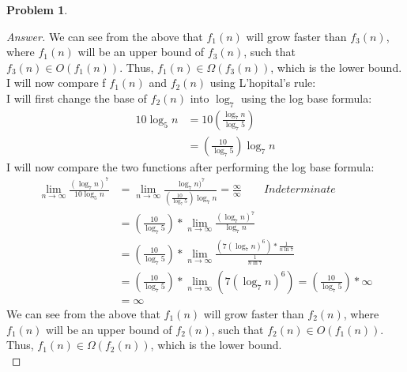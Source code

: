 \documentclass[11pt]{article}
\theoremstyle{definition}
\theoremstyle{definition}
\newtheorem{required}{Problem}
\theoremstyle{definition}
\begin{document}
\begin{required}
\begin{enumerate} [label=(\alph*)]
\begin{proof}[Answer]
We can see from the above that $f_1(n)$ will grow faster than $f_3(n)$, where $f_1(n)$ will be an upper bound of $f_3(n)$, such that $f_3(n) \in O(f_1(n))$. Thus, $f_1(n) \in \Omega(f_3(n))$, which is the lower bound. \\

I will now compare f $f_1(n)$ and $f_2(n)$ using L'hopital's rule:\\
I will first change the base of $f_2(n)$ into $\log_7$ using the log base formula: 
\begin{align*}
10\log_5n &= 10(\frac{\log_7n}{\log_7 5}) \\
&= (\frac{10}{\log_7 5})\log_7 n
\end{align*}
I will now compare the two functions after performing the log base formula: \\
\begin{align*}
\lim_{n \to \infty} \frac{(\log_7 n)^7}{10\log_5n} &= \lim_{n \to \infty} \frac{\log_7 n)^7}{(\frac{10}{\log_7 5})\log_7 n}  = \frac{\infty}{\infty} \qquad Indeterminate  \\
&= (\frac{10}{\log_7 5}) * \lim_{n \to \infty} \frac{(\log_7 n)^7}{\log_7 n}\\
&= (\frac{10}{\log_7 5}) * \lim_{n \to \infty} \frac{(7(\log_7 n)^6) * \frac{1}{n\ln7}}{\frac{1}{n\ln7}}\\
&= (\frac{10}{\log_7 5}) * \lim_{n \to \infty} (7(\log_7 n)^6) = (\frac{10}{\log_7 5})  * \infty\\
&= \infty
\end{align*} 
We can see from the above that $f_1(n)$ will grow faster than $f_2(n)$, where $f_1(n)$ will be an upper bound of $f_2(n)$, such that $f_2(n) \in O(f_1(n))$. Thus, $f_1(n) \in \Omega(f_2(n))$, which is the lower bound. \\


\end{proof}
\end{enumerate}
\end{required}
\end{document}
